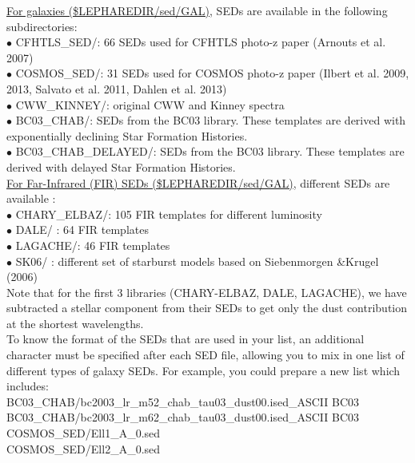 \documentclass[12pt]{article}
\begin{document}
  \noindent \underline{For galaxies (\$LEPHAREDIR/sed/GAL)}, SEDs are available in the following subdirectories: \\
  $\bullet$  CFHTLS\_SED/: 66 SEDs used for CFHTLS photo-z paper (Arnouts et al. 2007)  \\
  $\bullet$  COSMOS\_SED/: 31 SEDs used for COSMOS photo-z paper (Ilbert et al. 2009, 2013, Salvato et al. 2011, Dahlen et al. 2013)  \\ 
  $\bullet$  CWW\_KINNEY/: original CWW  and Kinney spectra \\
  $\bullet$  BC03\_CHAB/:  SEDs from the BC03 library. These templates are derived with exponentially declining Star Formation Histories.\\
  $\bullet$  BC03\_CHAB\_DELAYED/:  SEDs from the BC03 library. These templates are derived with delayed Star Formation Histories.\\
   
  \noindent \underline{For Far-Infrared (FIR) SEDs (\$LEPHAREDIR/sed/GAL)}, different SEDs are available :\\
  $\bullet$   CHARY\_ELBAZ/:  105 FIR templates for different luminosity \\
  $\bullet$   DALE/ : 64 FIR templates \\
  $\bullet$   LAGACHE/:  46 FIR templates \\
  $\bullet$  SK06/ :  different set of starburst models based on Siebenmorgen \&Krugel (2006)\\
  Note that for the first 3 libraries (CHARY-ELBAZ, DALE, LAGACHE),
   we have subtracted a stellar component from their SEDs to get only the dust contribution at the shortest wavelengths.  \\
  
\noindent To know the format of the SEDs that are used in your list, an additional character must be specified after each SED file, allowing you to mix in one list of different types of galaxy SEDs. 
 For example, you could prepare a new list which includes: \\
BC03\_CHAB/bc2003\_lr\_m52\_chab\_tau03\_dust00.ised\_ASCII  BC03 \\
BC03\_CHAB/bc2003\_lr\_m62\_chab\_tau03\_dust00.ised\_ASCII  BC03\\
COSMOS\_SED/Ell1\_A\_0.sed \\
COSMOS\_SED/Ell2\_A\_0.sed   \\
\end{document}
